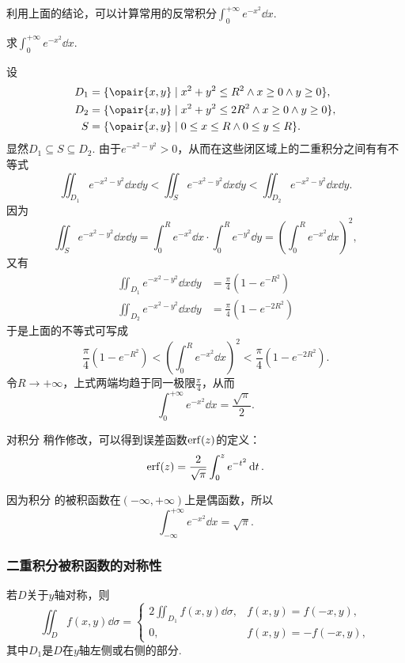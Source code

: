 利用上面的结论，可以计算常用的反常积分\(\int_0^{+\infty} e^{-x^2} \dd{x}\).
\begin{example}
求\(\int_0^{+\infty} e^{-x^2} \dd{x}\).
\begin{solution}
设\begin{align*}
D_1 &= \{ \opair{x,y} \mid x^2+y^2 \leq R^2 \land x \geq 0 \land y \geq 0 \}, \\
D_2 &= \{ \opair{x,y} \mid x^2+y^2 \leq 2 R^2 \land x \geq 0 \land y \geq 0 \}, \\
S &= \{ \opair{x,y} \mid 0 \leq x \leq R \land 0 \leq y \leq R \}.
\end{align*}显然\(D_1 \subseteq S \subseteq D_2\).
由于\(e^{-x^2-y^2} > 0\)，从而在这些闭区域上的二重积分之间有有不等式\[
\iint_{D_1} e^{-x^2-y^2}\dd{x}\dd{y}
< \iint_{S} e^{-x^2-y^2}\dd{x}\dd{y}
< \iint_{D_2} e^{-x^2-y^2}\dd{x}\dd{y}.
\]因为\[
\iint_{S}{e^{-x^2-y^2}\dd{x}\dd{y}}
= \int_0^R e^{-x^2}\dd{x} \cdot \int_0^R e^{-y^2} \dd{y}
= \left( \int_0^R e^{-x^2} \dd{x} \right)^2,
\]又有\begin{align*}
\iint_{D_1}{e^{-x^2-y^2}\dd{x}\dd{y}}
&= \frac{\pi}{4} (1 - e^{-R^2}) \\
\iint_{D_2}{e^{-x^2-y^2}\dd{x}\dd{y}}
&= \frac{\pi}{4} (1 - e^{-2 R^2})
\end{align*}于是上面的不等式可写成\[
\frac{\pi}{4} (1 - e^{-R^2})
< \left( \int_0^R e^{-x^2} \dd{x} \right)^2
< \frac{\pi}{4} (1 - e^{-2 R^2}).
\]令\(R \to +\infty\)，上式两端均趋于同一极限\(\frac{\pi}{4}\)，从而
\begin{equation}\label{equation:重积分.常用积分1}
\int_0^{+\infty} e^{-x^2} \dd{x} = \frac{\sqrt{\pi}}{2}.
\end{equation}
\end{solution}
\end{example}
对积分  稍作修改，可以得到误差函数\(\erf(z)\)的定义：
\begin{equation}
\erf(z) = \frac{2}{\sqrt{\pi}} \int_0^z e^{-t^2} \dd{t}.
\end{equation}

因为积分  的被积函数在\((-\infty,+\infty)\)上是偶函数，所以\begin{equation}\label{equation:重积分.常用积分2}
\int_{-\infty}^{+\infty} e^{-x^2} \dd{x} = \sqrt{\pi}.
\end{equation}

\subsubsection{二重积分被积函数的对称性}
\begingroup
\def\intx#1{\iint_{#1} f(x,y) \dd{\sigma}}
若\(D\)关于\(y\)轴对称，则\[
\intx{D} = \left\{ \begin{array}{cc}
2 \intx{D_1}, & f(x,y) = f(-x,y), \\
0, & f(x,y) = -f(-x,y),
\end{array} \right.
\]其中\(D_1\)是\(D\)在\(y\)轴左侧或右侧的部分.

